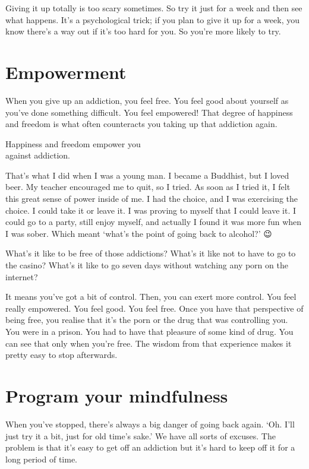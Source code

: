 \documentclass[12pt, openany]{book}
\newenvironment{aphorism}%
{%
\begin{center}\begin{itshape}
}%
{\end{itshape}\end{center}
}%
\begin{document}
Giving it up totally is too scary sometimes. So try it just for a week and then see what happens. It’s a psychological trick; if you plan to give it up for a week, you know there’s a way out if it’s too hard for you. So you’re more likely to try. 

\section*{Empowerment}

When you give up an addiction, you feel free. You feel good about yourself as you’ve done something difficult. You feel empowered! That degree of happiness and freedom is what often counteracts you taking up that addiction again. 

\newpage

\begin{aphorism}
Happiness and freedom empower you\\  
against addiction.
\end{aphorism}

That’s what I did when I was a young man. I became a Buddhist, but I loved beer. My teacher encouraged me to quit, so I tried. As soon as I tried it, I felt this great sense of power inside of me. I had the choice, and I was exercising the choice. I could take it or leave it. I was proving to myself that I could leave it. I could go to a party, still enjoy myself, and actually I found it was more fun when I was sober. Which meant ‘what’s the point of going back to alcohol?’ 😉 

What’s it like to be free of those addictions? What’s it like not to have to go to the casino? What’s it like to go seven days without watching any porn on the internet? 

It means you’ve got a bit of control. Then, you can exert more control. You feel really empowered. You feel good. You feel free. Once you have that perspective of being free, you realise that it’s the porn or the drug that was controlling you. You were in a prison. You had to have that pleasure of some kind of drug. You can see that only when you’re free. The wisdom from that experience makes it pretty easy to stop afterwards. 

\section*{Program your mindfulness}

When you’ve stopped, there’s always a big danger of going back again. ‘Oh. I’ll just try it a bit, just for old time’s sake.’ We have all sorts of excuses. The problem is that it’s easy to get off an addiction but it’s hard to keep off it for a long period of time. 
\end{document}
